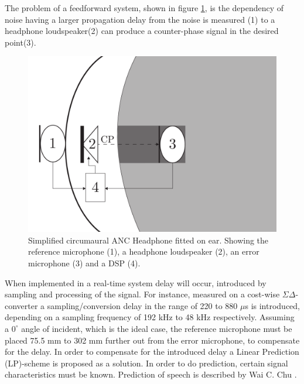 The problem of a feedforward system, shown in figure \ref{fig:SystemOverview}, is the dependency of noise having a larger propagation delay from the noise is measured (1) to a headphone loudspeaker(2) can produce a counter-phase signal in the desired point(3). 

\begin{figure}[H]
	\centering
	\includegraphics[width=1\columnwidth]{figures/ArticleIllustrations/BasicOverviewZoomed}
	\caption{Simplified circumaural ANC Headphone fitted on ear. Showing the reference microphone (1), a headphone loudspeaker (2), an error microphone (3) and a DSP (4).}
	\label{fig:SystemOverview}
\end{figure}

When implemented in a real-time system delay will occur, introduced by sampling and processing of the signal. For instance, measured on a cost-wise $\Sigma\Delta$-converter a sampling/conversion delay in the range of 220 to 880 $\mu$s is introduced, depending on a sampling frequency of 192 kHz to 48 kHz respectively. Assuming a $\text{0}^{\circ}$ angle of incident, which is the ideal case, the reference microphone must be placed 75.5 mm to 302 mm further out from the error microphone, to compensate for the delay. In order to compensate for the introduced delay a Linear Prediction (LP)-scheme is proposed as a solution.
In order to do prediction, certain signal characteristics must be known. Prediction of speech is described by Wai C. Chu \cite{Speech}. 

